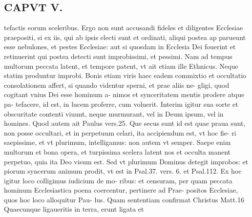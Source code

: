\documentclass{article}
\begin{document}
\begin{pages}
\section*{CAPVT  V. }
\marginpar{[ p.383 ]}\pstart tefactis eorum sceleribus. Ergo non sunt accusandi fideles et diligentes Ecclesiae praepositi, si ex iis, qui ab ipsis electi sunt et ordinati, aliqui postea ap parueunt esse nebulones, et pestes Ecclesiae: aut si quosdam in Ecclesia Dei fouerint et retinuerint qui postea detecti sunt improbissimi, et pessimi. Nam ad tempus multorum peccata latent, et tempore patent, vt ait etiam ille Ethnicus. Neque statim produntur improbi. Bonis etiam viris haec eadem commixtio et occultatio consolationem affert, si quando videntur sperni, et prae aliis ne- gligi, quod cogitant vnius Dei esse hominum a- nimos et synceritatem mentis prodere atque pa- tefacere, id est, in lucem proferre, cum voluerit. Interim igitur sua sorte et obscuritate contenti viuunt, neque murmurant, vel in Deum ipsum, vel in homines. Quod autem ait Paulus vers.25. Que secus sunt id est quae praua sunt, non posse occultari, et in perpetuum celari, ita accipiendum est, vt hoc fie- ri saepissime, et vt plurimum, intelligamus: non autem vt semper. Saepe enim multorum et bona opera, et turpissima scelera latent nos et occulta manent perpetuo, quia ita Deo visum est. Sed vt plurimum Dominus detegit improbos: et piorum syncerum animum prodit, vt est in Psal.37. vers. 6. et Psal.112. Ex hoc igitur loco colligimus iudicium de mo- ribus: et censuram, per quam peccata hominum Ecclesiastica poena coercentur, pertinere ad Prae- positos Ecclesiae, quos hoc loco alloquitur Pau- lus. Quam sententiam confirmat Christus Matt.16 Quaecunque ligaueritis in terra, erunt ligata et  \pend

\end{pages}
\end{document}
